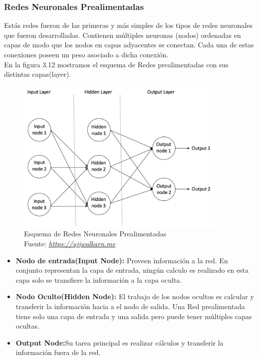 \subsubsection{Redes Neuronales Prealimentadas}
Estás redes fueron de las primeras y más simples de los tipos de redes neuronales que fueron desarrolladas. Contienen múltiples neuronas (nodos) ordenadas en capas de modo que los nodos en capas adyacentes se conectan. Cada una de estas conexiones poseen un peso asociado a dicha conexión.\\
En la figura 3.12 mostramos el esquema de Redes prealimentadas con sus distintas capas(layer).
\begin{figure}[H]
	\centering
	\includegraphics[width=0.9\textwidth]{Figures/esquemaff.png}
	\caption{Esquema de Redes Neuronales Prealimentadas \\ Fuente:  \href{https://ujjwalkarn.me/2016/08/09/quick-intro-neural-networks/}{\textit{https://ujjwalkarn.me}}}
	\label{neuronasredes}
\end{figure} 
\begin{itemize}
	\item \textbf{Nodo de entrada(Input Node):} Proveen información a la red. En conjunto representan la capa de entrada, ningún calculo es realizado en esta capa solo se transfiere la información a la capa oculta.
	\item \textbf{Nodo Oculto(Hidden Node):} El trabajo de los nodos ocultos es calcular y transferir la información hacia a el nodo de salida. Una Red prealimentada tiene solo una capa de entrada y una salida pero puede tener múltiples capas ocultas.
	\item \textbf{Output Node:}Su tarea principal es realizar cálculos y transferir la información fuera de la red.
\end{itemize}
